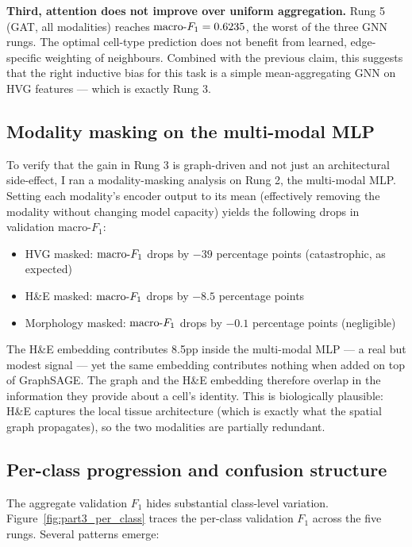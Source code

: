 \textbf{Third, attention does not improve over uniform aggregation.} Rung 5 (GAT, all modalities) reaches $\text{macro-}F_{1} = 0.6235$, the worst of the three GNN rungs. The optimal cell-type prediction does not benefit from learned, edge-specific weighting of neighbours. Combined with the previous claim, this suggests that the right inductive bias for this task is a simple mean-aggregating GNN on HVG features --- which is exactly Rung 3.

\subsection*{Modality masking on the multi-modal MLP}

To verify that the gain in Rung 3 is graph-driven and not just an architectural side-effect, I ran a modality-masking analysis on Rung 2, the multi-modal MLP. Setting each modality's encoder output to its mean (effectively removing the modality without changing model capacity) yields the following drops in validation macro-$F_1$:

\begin{itemize}
    \item HVG masked: $\text{macro-}F_{1}$ drops by $-39$ percentage points (catastrophic, as expected)
    \item H\&E masked: $\text{macro-}F_{1}$ drops by $-8.5$ percentage points
    \item Morphology masked: $\text{macro-}F_{1}$ drops by $-0.1$ percentage points (negligible)
\end{itemize}

The H\&E embedding contributes 8.5pp inside the multi-modal MLP --- a real but modest signal --- yet the same embedding contributes nothing when added on top of GraphSAGE. The graph and the H\&E embedding therefore overlap in the information they provide about a cell's identity. This is biologically plausible: H\&E captures the local tissue architecture (which is exactly what the spatial graph propagates), so the two modalities are partially redundant.

\subsection*{Per-class progression and confusion structure}

The aggregate validation $F_1$ hides substantial class-level variation. Figure~\ref{fig:part3_per_class} traces the per-class validation $F_1$ across the five rungs. Several patterns emerge:

